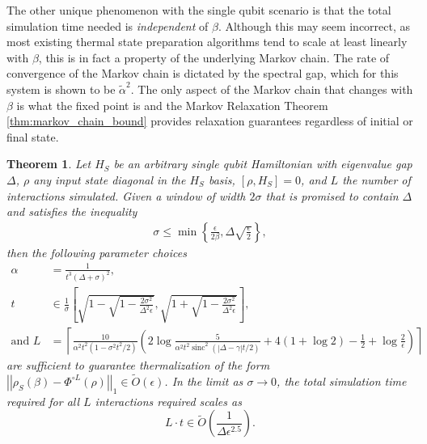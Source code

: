 \documentclass[
 amsmath,amssymb,
 aps,
onecolumn, 
nofootinbib]{revtex4-2}
\newtheorem{theorem}{Theorem}
\newcommand{\norm}[1]{\left|\left| #1 \right|\right|}
\newcommand{\set}[1]{\left\{ #1 \right\}}
\newcommand{\bigotilde}[1]{\widetilde{O} \left( #1 \right)}
\DeclareMathOperator{\sinc}{sinc}
\begin{document}
The other unique phenomenon with the single qubit scenario is that the total simulation time needed is \emph{independent} of $\beta$. Although this may seem incorrect, as most existing thermal state preparation algorithms tend to scale at least linearly with $\beta$, this is in fact a property of the underlying Markov chain. The rate of convergence of the Markov chain is dictated by the spectral gap, which for this system is shown to be $\widetilde{\alpha}^2$. The only aspect of the Markov chain that changes with $\beta$ is what the fixed point is and the Markov Relaxation Theorem \ref{thm:markov_chain_bound} provides relaxation guarantees regardless of initial or final state. 




\begin{theorem} \label{thm:single_qubit}
    Let $H_S$ be an arbitrary single qubit Hamiltonian with eigenvalue gap $\Delta$, $\rho$ any input state diagonal in the $H_S$ basis, $[\rho, H_S] = 0$, and $L$ the number of interactions simulated. Given a window of width $2 \sigma$ that is promised to contain $\Delta$ and satisfies the inequality
    \begin{align}
        \sigma \le \min \set{\frac{\epsilon}{2\beta}, \Delta \sqrt{\frac{\epsilon}{2}}},
    \end{align}
    then the following parameter choices 
    \begin{align}
        \alpha &= \frac{1}{t^3(\Delta + \sigma)^2}, \nonumber \\
        t &\in \frac{1}{\sigma}\left[\sqrt{1 - \sqrt{1 - \frac{2 \sigma^2}{\Delta^2 \epsilon}} }, \sqrt{1 + \sqrt{1 - \frac{2 \sigma^2}{\Delta^2 \epsilon}} } \right], \nonumber\\
        \text{and } L &= \left\lceil\frac{10}{\alpha^2 t^2 (1 - \sigma^2 t^2 / 2)} \left( 2 \log \frac{5}{\alpha^2 t^2 \sinc^2(|\Delta - \gamma|t/2)} + 4( 1 + \log 2) - \frac{1}{2} + \log \frac{2}{\epsilon} \right)\right\rceil
    \end{align}
    are sufficient to guarantee thermalization of the form $\norm{\rho_S(\beta) - \Phi^{\circ L}(\rho)}_1 \in \bigotilde{\epsilon}$. In the limit as $\sigma \to 0$, the total simulation time required for all $L$ interactions required scales as
    \begin{equation}
        L \cdot t \in \widetilde{O} \left( \frac{1}{\Delta \epsilon^{2.5}}\right).
    \end{equation}
\end{theorem}
\end{document}

